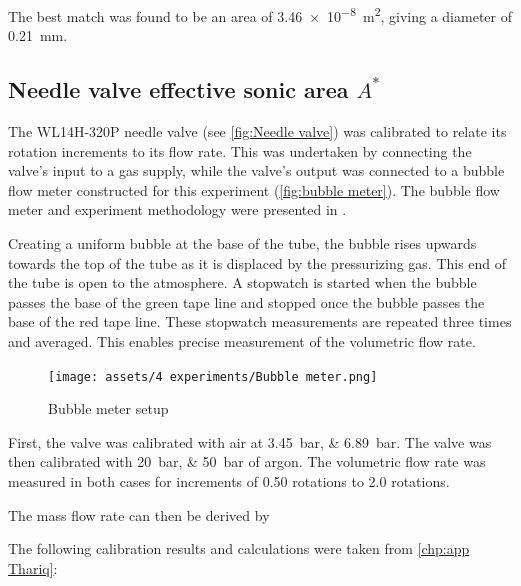             The best match was found to be an area of \qty{3.46e-8}{m^2}, giving a diameter of \qty{0.21}{mm}.

        \subsection{Needle valve effective sonic area $A^*$}

            The WL14H-320P needle valve (see \autoref{fig:Needle valve}) was calibrated to relate its rotation increments to its flow rate. This was undertaken by connecting the valve's input to a gas supply, while the valve's output was connected to a bubble flow meter constructed for this experiment (\autoref{fig:bubble meter}). The bubble flow meter and experiment methodology were presented in \textcite{barigouFluidMechanicsSoap1993}.

            Creating a uniform bubble at the base of the tube, the bubble rises upwards towards the top of the tube as it is displaced by the pressurizing gas. This end of the tube is open to the atmosphere. A stopwatch is started when the bubble passes the base of the green tape line and stopped once the bubble passes the base of the red tape line. These stopwatch measurements are repeated three times and averaged. This enables precise measurement of the volumetric flow rate.

            \begin{figure}[!ht]
                \centering
                \texttt{[image: assets/4 experiments/Bubble meter.png]}
                \caption{Bubble meter setup}
                \label{fig:bubble meter}
            \end{figure}

            First, the valve was calibrated with air at \qtylist{3.45;6.89}{bar}. The valve was then calibrated with \qtylist{20;50}{bar} of argon. The volumetric flow rate was measured in both cases for increments of 0.50 rotations to 2.0 rotations.

            The mass flow rate can then be derived by 

            The following calibration results and calculations were taken from \autoref{chp:app Thariq}:

